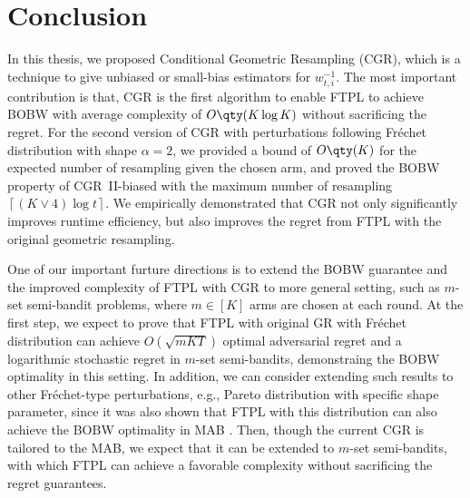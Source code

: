 \section{Conclusion}

In this thesis, we proposed
Conditional Geometric Resampling (CGR), which is a technique to give unbiased or small-bias estimators for $w_{t,i}^{-1}$.
The most important contribution is that, CGR is the first algorithm to enable FTPL to achieve BOBW with
average
complexity of $O\qty(K\log K)$ without sacrificing the regret.
For the second version of CGR with perturbations following Fr\'{e}chet distribution with shape $\alpha = 2$, we provided a bound of $O\qty(K)$ for the expected number of resampling given the chosen arm, and proved the BOBW property of CGR~II-biased with the maximum number of resampling $\left\lceil(K\lor 4)\log t\right\rceil$.
We empirically demonstrated that CGR not only significantly improves runtime efficiency, but also improves the regret from FTPL with the original geometric resampling. 

One of our important furture directions is to extend the BOBW guarantee and the improved complexity of FTPL with CGR to more general setting, such as $m$-set semi-bandit problems, where $m\in[K]$ arms are chosen at each round. 
At the first step, we expect to prove that FTPL with original GR with Fr\'{e}chet distribution can achieve $O(\sqrt{mKT})$ optimal adversarial regret \citep{audibert2014regret} and a logarithmic stochastic regret in $m$-set semi-bandits, demonstraing the BOBW optimality in this setting. 
In addition, we can consider extending such results to other Fr\'{e}chet-type perturbations, e.g., Pareto distribution with specific shape parameter, since it was also shown that FTPL with this distribution can also achieve the BOBW optimality in MAB \citep{pmlr-v247-lee24a}. 
Then, though the current CGR is tailored to the MAB, we expect that it can be extended to $m$-set semi-bandits, with which FTPL can achieve a favorable complexity without sacrificing the regret guarantees. 

